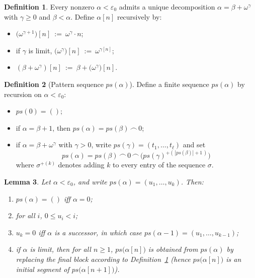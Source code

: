 \documentclass{article}
\newtheorem{lemma}{Lemma}[section]
\theoremstyle{definition}
\newtheorem{definition}[lemma]{Definition}
\theoremstyle{remark}
\begin{document}
\begin{definition}\label{def:alpha-n}
Every nonzero $\alpha<\varepsilon_0$ admits a unique decomposition $\alpha=\beta+\omega^\gamma$ with $\gamma\ge 0$ and $\beta<\alpha$.
Define $\alpha[n]$ recursively by:
\begin{itemize}
  \item $\bigl(\omega^{\gamma+1}\bigr)[n]\ :=\ \omega^\gamma\cdot n$;
  \item if $\gamma$ is limit, $\bigl(\omega^\gamma\bigr)[n]\ :=\ \omega^{\gamma[n]}$;
  \item $(\beta+\omega^\gamma)[n]\ :=\ \beta+\bigl(\omega^\gamma\bigr)[n]$.
\end{itemize}
\end{definition}

\begin{definition}[Pattern sequence $ps(\alpha)$]\label{def:ps}
Define a finite sequence $ps(\alpha)$ by recursion on $\alpha<\varepsilon_0$:
\begin{itemize}
  \item $ps(0)=()$;
  \item if $\alpha=\beta+1$, then $ps(\alpha)=ps(\beta)\,\frown\, 0$;
  \item if $\alpha=\beta+\omega^\gamma$ with $\gamma>0$, write $ps(\gamma)=(t_1,\ldots,t_\ell)$ and set
  \[
  ps(\alpha)=ps(\beta)\,\frown\, 0\,\frown\, \bigl(ps(\gamma)^{+(\,|ps(\beta)|+1\,)}\bigr)\,
  \]
  where $\sigma^{+(k)}$ denotes adding $k$ to every entry of the sequence $\sigma$.
\end{itemize}
\end{definition}

\begin{lemma}\label{lem:ps-basic}
Let $\alpha<\varepsilon_0$, and write $ps(\alpha)=(u_1,\ldots,u_k)$.
Then:
\begin{enumerate}
  \item $ps(\alpha)=()$ iff $\alpha=0$;
  \item for all $i$, $0\le u_i<i$;
  \item $u_k=0$ iff $\alpha$ is a successor, in which case $ps(\alpha-1)=(u_1,\ldots,u_{k-1})$;
  \item if $\alpha$ is limit, then for all $n\ge 1$, $ps\bigl(\alpha[n]\bigr)$ is obtained from $ps(\alpha)$ by replacing the final block according to Definition~\ref{def:alpha-n} (hence $ps\bigl(\alpha[n]\bigr)$ is an initial segment of $ps\bigl(\alpha[n+1]\bigr)$).
\end{enumerate}
\end{lemma}
\end{document}
